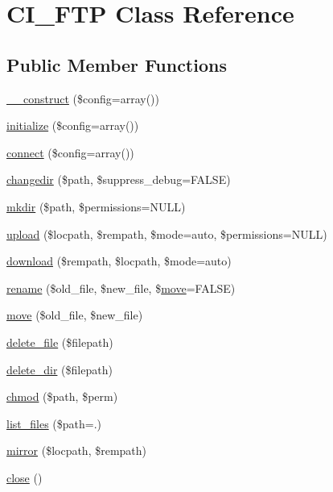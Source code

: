 \hypertarget{class_c_i___f_t_p}{}\section{C\+I\+\_\+\+F\+TP Class Reference}
\label{class_c_i___f_t_p}
\subsection*{Public Member Functions}
\begin{DoxyCompactItemize}
\item 
\mbox{\hyperlink{class_c_i___f_t_p_ab44e5032e8ed6ffdb5b638e03bca9bab}{\+\_\+\+\_\+construct}} (\$config=array())
\item 
\mbox{\hyperlink{class_c_i___f_t_p_a97881c4556c575a5b992053c44298a5c}{initialize}} (\$config=array())
\item 
\mbox{\hyperlink{class_c_i___f_t_p_afb016059625c88c4b7c4062f1193529d}{connect}} (\$config=array())
\item 
\mbox{\hyperlink{class_c_i___f_t_p_add6294004fdafefe45dc1608cc14148e}{changedir}} (\$path, \$suppress\+\_\+debug=F\+A\+L\+SE)
\item 
\mbox{\hyperlink{class_c_i___f_t_p_a2314dd7577d5d7e622f21aa89f4033d7}{mkdir}} (\$path, \$permissions=N\+U\+LL)
\item 
\mbox{\hyperlink{class_c_i___f_t_p_a29d8aee3b31b78a00b2bc064dda01ed7}{upload}} (\$locpath, \$rempath, \$mode=\textquotesingle{}auto\textquotesingle{}, \$permissions=N\+U\+LL)
\item 
\mbox{\hyperlink{class_c_i___f_t_p_abafde05766c43c3687d625028eee8d15}{download}} (\$rempath, \$locpath, \$mode=\textquotesingle{}auto\textquotesingle{})
\item 
\mbox{\hyperlink{class_c_i___f_t_p_a42ea2bdcfe4ff236e32d81f3da28a2e4}{rename}} (\$old\+\_\+file, \$new\+\_\+file, \$\mbox{\hyperlink{class_c_i___f_t_p_a0f76136dea56a91f46e90343da6e5d25}{move}}=F\+A\+L\+SE)
\item 
\mbox{\hyperlink{class_c_i___f_t_p_a0f76136dea56a91f46e90343da6e5d25}{move}} (\$old\+\_\+file, \$new\+\_\+file)
\item 
\mbox{\hyperlink{class_c_i___f_t_p_a145d886c73fc1915975e715b9cf57eb9}{delete\+\_\+file}} (\$filepath)
\item 
\mbox{\hyperlink{class_c_i___f_t_p_ab262d3aa6ee1d2247d494b6fd26c4788}{delete\+\_\+dir}} (\$filepath)
\item 
\mbox{\hyperlink{class_c_i___f_t_p_aee71784398ceaa0bfb6b432d8257194c}{chmod}} (\$path, \$perm)
\item 
\mbox{\hyperlink{class_c_i___f_t_p_a0fe65e7a54ccef2c844bec153ed4b38f}{list\+\_\+files}} (\$path=\textquotesingle{}.\textquotesingle{})
\item 
\mbox{\hyperlink{class_c_i___f_t_p_a6e1e4df693b8ef6926c05b44fcd96d4d}{mirror}} (\$locpath, \$rempath)
\item 
\mbox{\hyperlink{class_c_i___f_t_p_a7ed46fcee27e77e53db4d81e16a9d9fd}{close}} ()
\end{DoxyCompactItemize}
